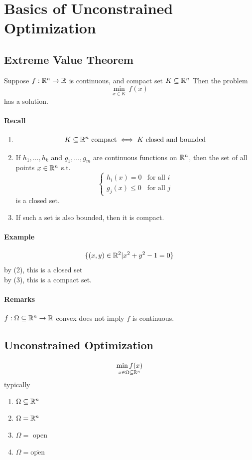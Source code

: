 \documentclass[11pt]{article}
\begin{document}
\section{Basics of Unconstrained Optimization}
\subsection{Extreme Value Theorem}
Suppose $f: \mathbb{R}^n \rightarrow \mathbb{R}$ is continuous, and compact set $K \subseteq \mathbb{R}^n$
Then the problem
$$\underset{x \in K}{\min} \, f(x)$$ has a solution.

\paragraph{Recall}
\begin{enumerate}
	\item $$K \subseteq \mathbb{R}^n \text{ compact} \iff K \text{ closed and bounded}$$
	\item If $h_1, \hdots, h_k$ and $g_1, \hdots, g_m$ are continuous functions on $\mathbb{R}^n$, then the set of all points $x \in \mathbb{R}^n$ s.t.
	$$\begin{cases}
		h_i(x) = 0  &\text{for all $i$} \\
		g_j(x) \leq 0 &\text{for all $j$}
	\end{cases}$$
	is a closed set.
	\item If such a set is also bounded, then it is compact.
\end{enumerate}

\paragraph{Example}
$$\{(x,y) \in \mathbb{R}^2 | x^2 + y^2 -1 = 0 \}$$
by (2), this is a closed set \\
by (3), this is a compact set.

\paragraph{Remarks}
$f: \Omega \subseteq \mathbb{R}^n \rightarrow \mathbb{R}$ convex does not imply $f$ is continuous.

\subsection{Unconstrained Optimization}
$$\underset{x \in \Omega \subseteq \mathbb{R}^n}{\min f(x)}$$
typically
\begin{enumerate}
	\item $\Omega \subseteq \mathbb{R}^n$
	\item $\Omega = \mathbb{R}^n$
	\item $\Omega = $ open
	\item $\Omega = \overline{\text{open}}$ 
\end{enumerate}
\end{document}
